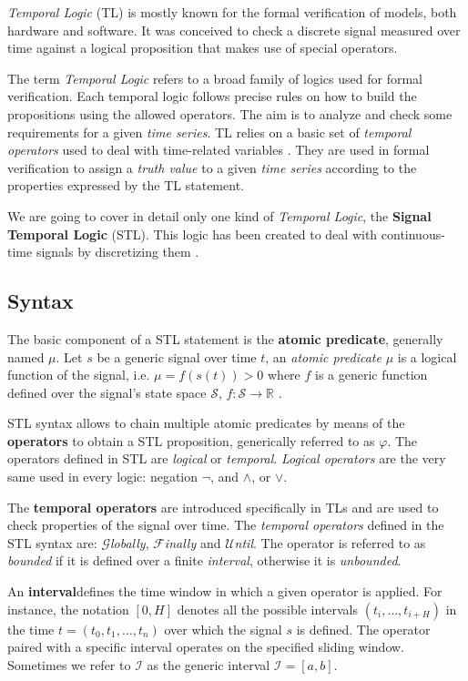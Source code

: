\textit{Temporal Logic} (TL) is mostly known for the formal verification of models, both hardware and software.
It was conceived to check a discrete signal measured over time against a logical proposition that makes use of special operators.

The term \textit{Temporal Logic} refers to a broad family of logics used for formal verification.
Each temporal logic follows precise rules on how to build the propositions using the allowed operators.
The aim is to analyze and check some requirements for a given \textit{time series}.
TL relies on a basic set of \textit{temporal operators} used to deal with time-related variables \cite{sep-logic-temporal}.
They are used in formal verification to assign a \textit{truth value} to a given \textit{time series} according to the properties expressed by the TL statement.

We are going to cover in detail only one kind of \textit{Temporal Logic}, the \textbf{Signal Temporal Logic} (STL).
This logic has been created to deal with continuous-time signals by discretizing them \cite{stl2004}.

\subsection{Syntax}
The basic component of a STL statement is the \textbf{atomic predicate}, generally named $\mu$.
Let $s$ be a generic signal over time $t$, an \textit{atomic predicate} $\mu$ is a logical function of the signal, i.e. $\mu = f(s(t)) > 0$ where $f$ is a generic function defined over the signal's state space $\mathcal{S}$, $f: \mathcal{S} \to \mathbb{R}$ .

STL syntax allows to chain multiple atomic predicates by means of the \textbf{operators} to obtain a STL proposition, generically referred to as $\varphi$.
The operators defined in STL are \textit{logical} or \textit{temporal}.
\textit{Logical operators} are the very same used in every logic: negation $\neg$, and $\wedge$, or $\vee$.

The \textbf{temporal operators} are introduced specifically in TLs and are used to check properties of the signal over time.
The \textit{temporal operators} defined in the STL syntax are: $\mathcal{G}$\textit{lobally}, $\mathcal{F}$\textit{inally} and $\mathcal{U}$\textit{ntil}.
The operator is referred to as \textit{bounded} if it is defined over a finite \textit{interval}, otherwise it is \textit{unbounded}.

An \textbf{interval}defines the time window in which a given operator is applied.
For instance, the notation $[0,H]$ denotes all the possible intervals $(t_i, \dots, t_{i+H})$ in the time $t = (t_0, t_1, \dots, t_n)$ over which the signal $s$ is defined.
The operator paired with a specific interval operates on the specified sliding window.
Sometimes we refer to $\mathcal{I}$ as the generic interval $\mathcal{I} = [a,b]$.

